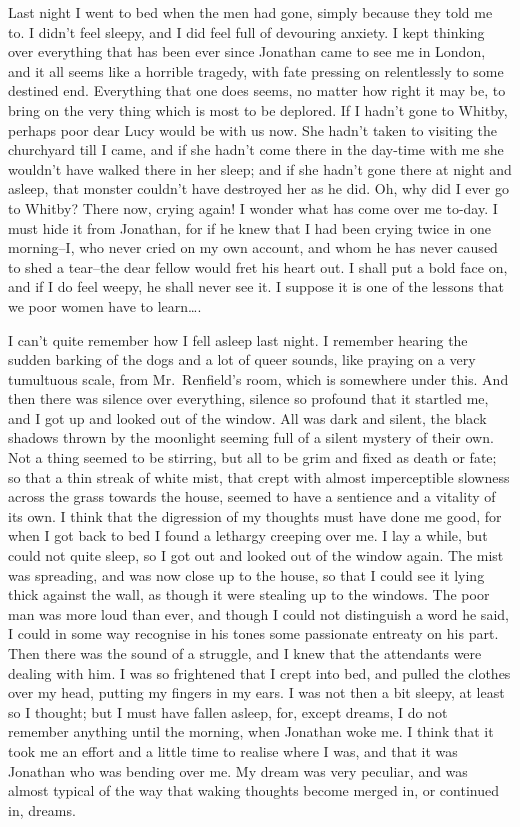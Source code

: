 \documentclass[12pt,openright]{book}
\begin{document}
Last night I went to bed when the men had gone, simply because they told me to. I didn’t feel sleepy, and I did feel full of devouring anxiety. I kept thinking over everything that has been ever since Jonathan came to see me in London, and it all seems like a horrible tragedy, with fate pressing on relentlessly to some destined end. Everything that one does seems, no matter how right it may be, to bring on the very thing which is most to be deplored. If I hadn’t gone to Whitby, perhaps poor dear Lucy would be with us now. She hadn’t taken to visiting the churchyard till I came, and if she hadn’t come there in the day-time with me she wouldn’t have walked there in her sleep; and if she hadn’t gone there at night and asleep, that monster couldn’t have destroyed her as he did. Oh, why did I ever go to Whitby? There now, crying again! I wonder what has come over me to-day. I must hide it from Jonathan, for if he knew that I had been crying twice in one morning–I, who never cried on my own account, and whom he has never caused to shed a tear–the dear fellow would fret his heart out. I shall put a bold face on, and if I do feel weepy, he shall never see it. I suppose it is one of the lessons that we poor women have to learn….

I can’t quite remember how I fell asleep last night. I remember hearing the sudden barking of the dogs and a lot of queer sounds, like praying on a very tumultuous scale, from Mr. Renfield’s room, which is somewhere under this. And then there was silence over everything, silence so profound that it startled me, and I got up and looked out of the window. All was dark and silent, the black shadows thrown by the moonlight seeming full of a silent mystery of their own. Not a thing seemed to be stirring, but all to be grim and fixed as death or fate; so that a thin streak of white mist, that crept with almost imperceptible slowness across the grass towards the house, seemed to have a sentience and a vitality of its own. I think that the digression of my thoughts must have done me good, for when I got back to bed I found a lethargy creeping over me. I lay a while, but could not quite sleep, so I got out and looked out of the window again. The mist was spreading, and was now close up to the house, so that I could see it lying thick against the wall, as though it were stealing up to the windows. The poor man was more loud than ever, and though I could not distinguish a word he said, I could in some way recognise in his tones some passionate entreaty on his part. Then there was the sound of a struggle, and I knew that the attendants were dealing with him. I was so frightened that I crept into bed, and pulled the clothes over my head, putting my fingers in my ears. I was not then a bit sleepy, at least so I thought; but I must have fallen asleep, for, except dreams, I do not remember anything until the morning, when Jonathan woke me. I think that it took me an effort and a little time to realise where I was, and that it was Jonathan who was bending over me. My dream was very peculiar, and was almost typical of the way that waking thoughts become merged in, or continued in, dreams.
\end{document}
